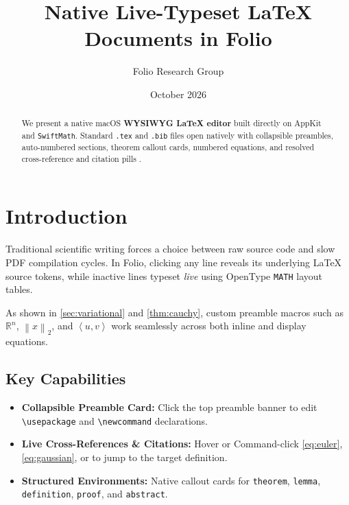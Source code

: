\documentclass[11pt,a4paper]{article}
\newcommand{\R}{\mathbb{R}}
\newcommand{\norm}[1]{\left\lVert #1 \right\rVert}
\newcommand{\inner}[2]{\left\langle #1, #2 \right\rangle}
\begin{document}
\title{Native Live-Typeset \LaTeX{} Documents in Folio}
\author{Folio Research Group}
\date{October 2026}
\maketitle

\begin{abstract}
We present a native macOS \textbf{WYSIWYG \LaTeX{} editor} built directly on AppKit and \texttt{SwiftMath}. Standard \texttt{.tex} and \texttt{.bib} files open natively with collapsible preambles, auto-numbered sections, theorem callout cards, numbered equations, and resolved cross-reference and citation pills \cite{knuth1984texbook,vaswani2017attention}.
\end{abstract}

\section{Introduction}\label{sec:intro}

Traditional scientific writing forces a choice between raw source code and slow PDF compilation cycles. In Folio, clicking any line reveals its underlying \LaTeX{} source tokens, while inactive lines typeset \emph{live} using OpenType \texttt{MATH} layout tables.

As shown in \autoref{sec:variational} and \autoref{thm:cauchy}, custom preamble macros such as $\R^n$, $\norm{x}_2$, and $\inner{u}{v}$ work seamlessly across both inline and display equations.

\subsection{Key Capabilities}\label{sec:capabilities}

\begin{itemize}
  \item \textbf{Collapsible Preamble Card:} Click the top preamble banner to edit \texttt{\textbackslash usepackage} and \texttt{\textbackslash newcommand} declarations.
  \item \textbf{Live Cross-References \& Citations:} Hover or Command-click \autoref{eq:euler}, \eqref{eq:gaussian}, or \cite{einstein1905electrodynamics} to jump to the target definition.
  \item \textbf{Structured Environments:} Native callout cards for \texttt{theorem}, \texttt{lemma}, \texttt{definition}, \texttt{proof}, and \texttt{abstract}.
\end{itemize}
\end{document}
